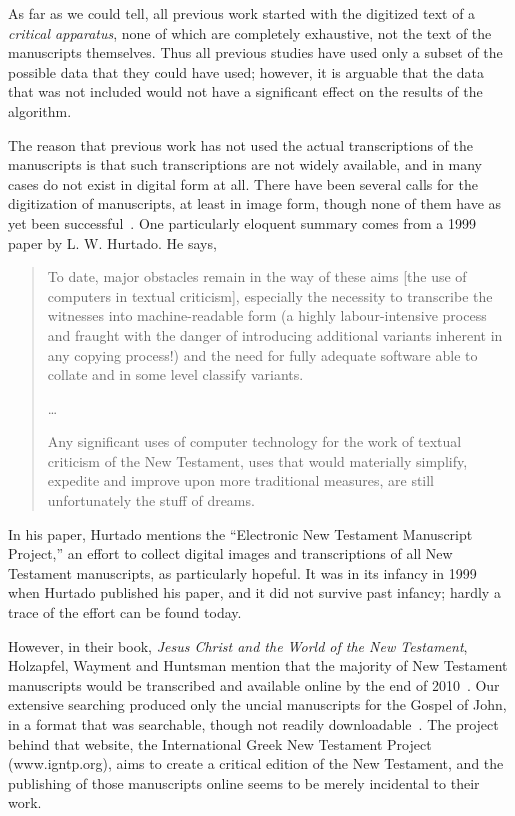 \documentclass[onecolumn, 12pt]{article}
\begin{document}
As far as we could tell, all previous work started with the digitized text of a
\emph{critical apparatus}, none of which are completely exhaustive, not the
text of the manuscripts themselves.  Thus all previous studies have used only a
subset of the possible data that they could have used; however, it is arguable
that the data that was not included would not have a significant effect on the
results of the algorithm.

The reason that previous work has not used the actual transcriptions of the
manuscripts is that such transcriptions are not widely available, and in many
cases do not exist in digital form at all.  There have been several calls for
the digitization of manuscripts, at least in image form, though none of them
have as yet been successful~\cite{trobisch-2000-central-electronic-database}.
One particularly eloquent summary comes from a 1999 paper by L. W. Hurtado.  He
says,
\begin{quotation}
To date, major obstacles remain in the way of these aims [the use of computers
in textual criticism], especially the necessity to transcribe the witnesses
into machine-readable form (a highly labour-intensive process and fraught with
the danger of introducing additional variants inherent in any copying process!)
and the need for fully adequate software able to collate and in some level
classify variants.

\ldots

Any significant uses of computer technology for the work of textual criticism
of the New Testament, uses that would materially simplify, expedite and improve
upon more traditional measures, are still unfortunately the stuff of
dreams.~\cite{hurtado-1999-beyond-the-interlude}
\end{quotation}

In his paper, Hurtado mentions the ``Electronic New Testament Manuscript
Project,'' an effort to collect digital images and transcriptions of all New
Testament manuscripts, as particularly hopeful.  It was in its infancy in 1999
when Hurtado published his paper, and it did not survive past infancy; hardly a
trace of the effort can be found today.

However, in their book, \emph{Jesus Christ and the World of the New Testament},
Holzapfel, Wayment and Huntsman mention that the majority of New Testament
manuscripts would be transcribed and available online by the end of
2010~\cite[?]{holzapfel-2006-jesus-christ-new-testament}.  Our extensive
searching produced only the uncial manuscripts for the Gospel of John, in a
format that was searchable, though not readily
downloadable~\cite{igntp-gospel-of-john-online}.  The project behind that
website, the International Greek New Testament Project (www.igntp.org), aims to
create a critical edition of the New Testament, and the publishing of those
manuscripts online seems to be merely incidental to their work.
\end{document}
